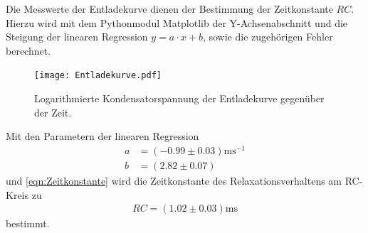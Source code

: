 \noindent Die Messwerte der Entladekurve dienen der Bestimmung der Zeitkonstante $RC$.  
Hierzu wird mit dem Pythonmodul Matplotlib \cite{matplotlib} der Y-Achsenabschnitt und die Steigung der linearen Regression $y = a \cdot x + b$, 
sowie die zugehörigen Fehler berechnet.\\
\begin{figure}[H]
  \centering
  \texttt{[image: Entladekurve.pdf]}
  \caption{Logarithmierte Kondensatorspannung der Entladekurve gegenüber der Zeit.}
  \label{fig:Entladekurve_plot}
\end{figure}
Mit den Parametern der linearen Regression
\begin{align*}
a &= (-0.99 ± 0.03)\si{\milli\second\tothe{-1}} \\
b &= (2.82 ± 0.07)
\end{align*}
und \autoref{eqn:Zeitkonstante} wird die Zeitkonstante des Relaxationsverhaltens am RC-Kreis zu
\begin{align*}
  RC=(1.02 ± 0.03)\si{\milli\second}
\end{align*}
bestimmt.


